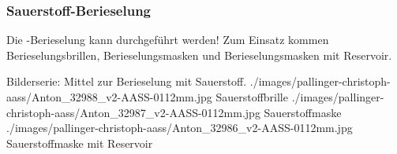 \subsubsection{Sauerstoff-Berieselung}
\label{topic:berieselung}
\label{topic:berieselungsbrille}
\label{topic:berieselungsmaske}

Die -Berieselung kann  durchgeführt werden! Zum Einsatz kommen
Berieselungsbrillen, Berieselungsmasken und
Berieselungsmasken mit Reservoir.


% 
% 
% 

\begin{PictureSeriesWide}{}
{Bilderserie: Mittel zur Berieselung mit Sauerstoff. }
{./images/pallinger-christoph-aass/Anton_32988_v2-AASS-0112mm.jpg}
{Sauerstoffbrille}
{./images/pallinger-christoph-aass/Anton_32987_v2-AASS-0112mm.jpg}
{Sauerstoffmaske}
{./images/pallinger-christoph-aass/Anton_32986_v2-AASS-0112mm.jpg}
{Sauerstoffmaske mit Reservoir}
{}
{}
\end{PictureSeriesWide}


